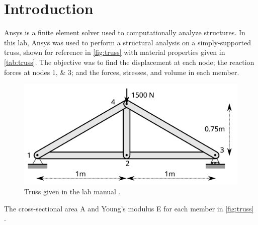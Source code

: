 \chapter{Introduction}\label{cp:introduction}

Ansys is a finite element solver used to computationally analyze structures. In this lab, Ansys was used to perform a structural analysis on a simply-supported truss, shown for reference in \autoref{fig:truss} with material properties given in \autoref{tab:truss}. The objective was to find the displacement at each node; the reaction forces at nodes \numlist{1;3}; and the forces, stresses, and volume in each member.

\begin{figure}[htpb]
    \centering
    \includegraphics[width=\linewidth]{Figures/given_figure.png}
    \caption[Truss given in the lab manual]{Truss given in the lab manual \citep{runnels2024}.}
    \label{fig:truss}
\end{figure}

\begin{table}[htpb]
    \centering
    \caption[Given material properties]{The cross-sectional area \gls{A} and Young's modulus \gls{E} for each member in \autoref{fig:truss} \citep{runnels2024}.}
    
    \label{tab:truss}
\end{table}